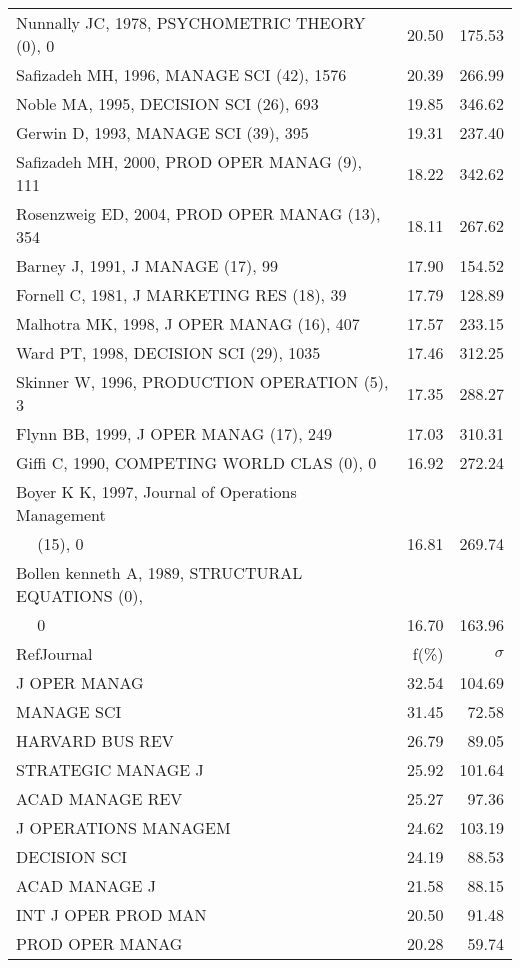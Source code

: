\documentclass[a4paper,11pt]{report}
\begin{document}
\begin{landscape}
\begin{table}[!ht]
{\begin{tabular}{|l r r|}
Nunnally JC, 1978, PSYCHOMETRIC THEORY (0), 0 & 20.50 & 175.53\\
Safizadeh MH, 1996, MANAGE SCI (42), 1576 & 20.39 & 266.99\\
Noble MA, 1995, DECISION SCI (26), 693 & 19.85 & 346.62\\
Gerwin D, 1993, MANAGE SCI (39), 395 & 19.31 & 237.40\\
Safizadeh MH, 2000, PROD OPER MANAG (9), 111 & 18.22 & 342.62\\
Rosenzweig ED, 2004, PROD OPER MANAG (13), 354 & 18.11 & 267.62\\
Barney J, 1991, J MANAGE (17), 99 & 17.90 & 154.52\\
Fornell C, 1981, J MARKETING RES (18), 39 & 17.79 & 128.89\\
Malhotra MK, 1998, J OPER MANAG (16), 407 & 17.57 & 233.15\\
Ward PT, 1998, DECISION SCI (29), 1035 & 17.46 & 312.25\\
Skinner W, 1996, PRODUCTION OPERATION (5), 3 & 17.35 & 288.27\\
Flynn BB, 1999, J OPER MANAG (17), 249 & 17.03 & 310.31\\
Giffi C, 1990, COMPETING WORLD CLAS (0), 0 & 16.92 & 272.24\\
Boyer K K, 1997, Journal of Operations Management &  & \\
$\quad$ (15), 0 & 16.81 & 269.74\\
Bollen kenneth A, 1989, STRUCTURAL EQUATIONS (0), &  & \\
$\quad$ 0 & 16.70 & 163.96\\
\hline
\hline
RefJournal & f(\%) & $\sigma$\\
\hline
J OPER MANAG & 32.54 & 104.69\\
MANAGE SCI & 31.45 & 72.58\\
HARVARD BUS REV & 26.79 & 89.05\\
STRATEGIC MANAGE J & 25.92 & 101.64\\
ACAD MANAGE REV & 25.27 & 97.36\\
J OPERATIONS MANAGEM & 24.62 & 103.19\\
DECISION SCI & 24.19 & 88.53\\
ACAD MANAGE J & 21.58 & 88.15\\
INT J OPER PROD MAN & 20.50 & 91.48\\
PROD OPER MANAG & 20.28 & 59.74\\
\hline
\end{tabular}
}
\end{table}


\end{landscape}
\end{document}
